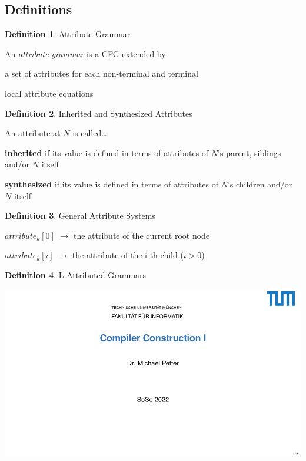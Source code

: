 \documentclass[10pt, landscape]{article}
\theoremstyle{definition}
\newtheorem{definition}{Definition}[section]
\begin{document}
\begin{multicols*}{3}
\subsection*{Definitions}

\begin{definition}{Attribute Grammar}

  An \textit{attribute grammar} is a CFG extended by
  \begin{compactitem}
    \item a set of attributes for each non-terminal and terminal
    \item local attribute equations
  \end{compactitem}
\end{definition}

\begin{definition}{Inherited and Synthesized Attributes}

  An attribute at $N$ is called\dots
  \begin{compactitem}
    \item \textbf{inherited} if its value is defined in terms of attributes of $N$'s parent, siblings and/or $N$ itself
    \item \textbf{synthesized} if its value is defined in terms of attributes of $N$'s children and/or $N$ itself
  \end{compactitem}
\end{definition}

\begin{definition}{General Attribute Systems}
  \begin{compactitem}
    \item {\color{red} $attribute_{k}[0]$} $\rightarrow$ the attribute of the current root node
    \item {\color{red} $attribute_{k}[i]$} $\rightarrow$ the attribute of the i-th child ($i > 0$)
  \end{compactitem}
\end{definition}

\begin{definition}{L-Attributed Grammars}

  \includegraphics[page=205, width=\columnwidth, trim= 2.3cm 5.8cm 3cm .85cm, clip]{./selfservice-handout.pdf}


\end{definition}
\end{multicols*}
\end{document}
